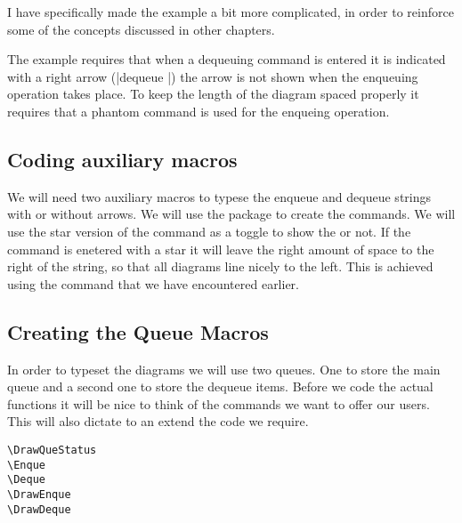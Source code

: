 I have specifically made the example a bit more complicated, in order to reinforce some of the concepts discussed in other chapters.

The example requires that when a dequeuing command is entered it is indicated with a right arrow (|dequeue \rightarrow|) the arrow is not shown when the enqueuing operation takes place. To keep the length of the diagram spaced properly it requires that a phantom command is used for the enqueing operation.

\subsection{Coding auxiliary macros}

We will need two auxiliary macros to typese the enqueue and dequeue strings with or without arrows. We will use the  package to create the commands. We will use the star version of the command as a toggle to show the  or not. If the command is enetered with a star it will leave the right amount of space to the right of the string, so that all diagrams line nicely to the left. This is achieved using the   command that we have encountered earlier.

\begin{teXXX}
\NewDocumentCommand{}
\NewDocumentCommand{}
\end{teXXX}

\subsection{Creating the Queue Macros}

In order to typeset the diagrams we will use two queues. One to store the main queue and a second one to store the dequeue items. Before we code the actual functions it will be nice to think of the  commands we want to offer our users. This will also dictate to an extend the code we require.

\begin{verbatim}
\DrawQueStatus
\Enque
\Deque
\DrawEnque
\DrawDeque
\end{verbatim}

